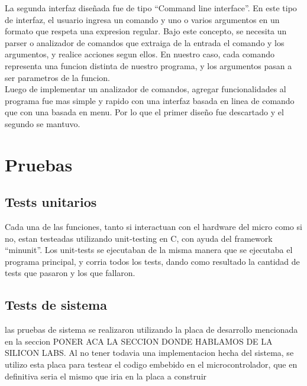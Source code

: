 La segunda interfaz diseñada fue de tipo ``Command line interface''. En este tipo de interfaz, el usuario ingresa un comando y uno o varios argumentos en un formato que respeta una expresion regular. Bajo este concepto, se necesita un parser o analizador de comandos que extraiga de la entrada el comando y los argumentos, y realice acciones segun ellos. En nuestro caso, cada comando representa una funcion distinta de nuestro programa, y los argumentos pasan a ser parametros de la funcion. \\

Luego de implementar un analizador de comandos, agregar funcionalidades al programa fue mas simple y rapido con una interfaz basada en linea de comando que con una basada en menu. Por lo que el primer diseño fue descartado y el segundo se mantuvo.





\section{Pruebas} %
\label{sec:pruebas}


\subsection{Tests unitarios} %
\label{sub:tests_unitarios}

Cada una de las funciones, tanto si interactuan con el hardware del micro como si no, estan testeadas utilizando unit-testing en C, con ayuda del framework ``minunit''\cite{minunit}. Los unit-tests se ejecutaban de la misma manera que se ejecutaba el programa principal, y corria todos los tests, dando como resultado la cantidad de tests que pasaron y los que fallaron.


\subsection{Tests de sistema} %
\label{sub:tests_de_sistema}

las pruebas de sistema se realizaron utilizando la placa de desarrollo mencionada en la seccion PONER ACA LA SECCION DONDE HABLAMOS DE LA SILICON LABS. Al no tener todavia una implementacion hecha del sistema, se utilizo esta placa para testear el codigo embebido en el microcontrolador, que en definitiva seria el mismo que iria en la placa a construir

